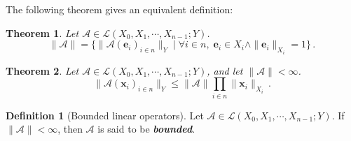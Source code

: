\documentclass[openany]{book}
\newcommand*{\indexbf}[1]{\emph{\textbf{#1}}\index{#1}} %
\theoremstyle{plain}
\newtheorem{theorem}{Theorem}[section] %
\theoremstyle{definition}
\newtheorem{definition}{Definition}[section] %
\newcommand*{\bv}{\boldsymbol} %
\begin{document}
The following theorem gives an equivalent definition:

\begin{theorem}
	Let $\mathscr A \in \mathcal L(X_0, X_1, \cdots, X_{n - 1}; Y)$.
	\begin{equation}
		\|\mathscr A\| = 
		\{ 
			\|\mathscr A(\bv e_i)_{i \in n}\|_Y
		\mid
			\forall i \in n,\; \bv e_i \in X_i \wedge \|\bv e_i\|_{X_i} = 1
		\} \,.
	\end{equation}
\end{theorem}

\begin{theorem}
	Let $\mathscr A \in \mathcal L(X_0, X_1, \cdots, X_{n - 1}; Y)$, and let $\|\mathscr A\| < \infty$.
	\begin{equation}
		\|\mathscr A(\bv x_i)_{i \in n}\|_Y 
			\leq \|\mathscr A\| \prod_{i \in n} \|\bv x_i\|_{X_i}\,.
	\end{equation}
\end{theorem}

\begin{definition}[Bounded linear operators]
	Let $\mathscr A \in \mathcal L(X_0, X_1, \cdots, X_{n - 1}; Y)$. 
	If $\|\mathscr A\| < \infty$, then $\mathscr A$ is said to be \indexbf{bounded}.
\end{definition}
\end{document}
